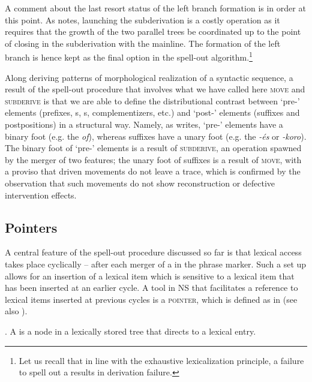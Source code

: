 \noindent
A comment about the last resort status of the left branch formation is in order at this point. As \cite{Starke2018} notes, launching the subderivation is a costly operation as it requires that the growth of the two parallel trees be coordinated up to the point of closing in the subderivation with the mainline. The formation of the left branch is hence kept as the final option in the spell-out algorithm.\footnote{Let us recall that in line with the exhaustive lexicalization principle, a failure to spell out a  results in derivation failure. 
}%
\par Along deriving patterns of morphological realization of a syntactic sequence, a result of the spell-out procedure that involves what we have called here \textsc{move} and \textsc{subderive} is that we are able to define the distributional contrast between \mbox{`pre-'} elements (prefixes, s, s, complementizers, etc.) and \mbox{`post-'} elements (suffixes and postpositions) in a structural way. Namely, as \cite{Starke2018} writes, `pre-' elements have a binary foot (e.g. the  \textit{of}), whereas suffixes have a unary foot (e.g. the  \textit{-\'es} or \textit{-koro}). The binary foot of `pre-' elements is a result of \textsc{subderive}, an operation spawned by the merger of two features; the unary foot of suffixes is a result of \textsc{move}, with a proviso that  driven movements do not leave a trace, which is confirmed by the observation that such movements do not show reconstruction or defective intervention effects. 


\subsection{Pointers}\label{sec:pointers}

A central feature of the spell-out procedure discussed so far is that lexical access takes place cyclically -- after each merger of a  in the phrase marker. Such a set up allows for an insertion of a lexical item which is sensitive to a lexical item that has been inserted at an earlier cycle. A tool in NS  that facilitates a reference to lexical items inserted at previous cycles is a \textsc{pointer}, which is defined as in \Next (see also \citealt{TaraldsenNELS,CahaPantcheva2012,Starke2014,GVW2018,CCW-root}). 

\ex. A  is a node in a lexically stored tree that directs to a lexical entry.

